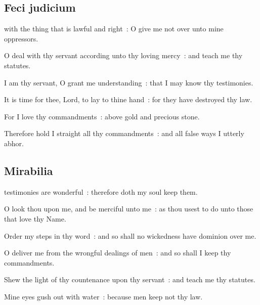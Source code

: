 \subsection{Feci judicium}
 with the thing that is lawful and right~: O give me not over unto mine oppressors.\par
{}
O deal with thy servant according unto thy loving mercy~: and teach me thy statutes.\par
{}I am thy servant, O grant me understanding~: that I may know thy testimonies.\par
{}It is time for thee, Lord, to lay to thine hand~: for they have destroyed thy law.\par
{}For I love thy commandments~: above gold and precious stone.\par
{}Therefore hold I straight all thy commandments~: and all false ways I utterly abhor.\par

\clearpage
\subsection{Mirabilia}
 testimonies are wonderful~: therefore doth my soul keep them.\par
{}
O look thou upon me, and be merciful unto me~: as thou usest to do unto those that love thy Name.\par
{}Order my steps in thy word~: and so shall no wickedness have dominion over me.\par
{}O deliver me from the wrongful dealings of men~: and so shall I keep thy commandments.\par
{}Shew the light of thy countenance upon thy servant~: and teach me thy statutes.\par
{}Mine eyes gush out with water~: because men keep not thy law.\par

